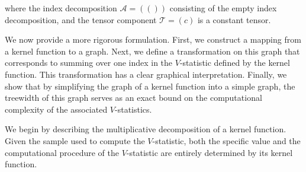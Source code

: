 \documentclass[letterpaper,11pt]{article}
\newcommand{\Lin}[1]{{\color{purple}{Lin: #1}}}
\newcommand{\samplespace}{\bbX}
\newcommand{\takesetp}[1]{\mathrm{set}[#1]}
\newcommand{\perm}[1]{\mathrm{Perm}(#1)}
\newcommand{\cover}{\mathcal{C}}
\begin{document}
\begin{bibunit}[plainnat]
where the index decomposition $\mathcal{A} = (( ))$ consisting of the empty index decomposition, and the tensor component $\mathcal{T} = ( c )$ is a constant tensor. 




We now provide a more rigorous formulation. First, we construct a mapping from a kernel function to a graph. Next, we define a transformation on this graph that corresponds to summing over one index in the $V$-statistic defined by the kernel function. This transformation has a clear graphical interpretation. Finally, we show that by simplifying the graph of a kernel function into a simple graph, the treewidth of this graph serves as an exact bound on the computational complexity of the associated $V$-statistics.

We begin by describing the multiplicative decomposition of a kernel function. \Lin{we probably should check if such a concept has been defined somewhere in math literature} Given the sample used to compute the $V$-statistic, both the specific value and the computational procedure of the $V$-statistic are entirely determined by its kernel function. 



     

\end{bibunit}
\end{document}
